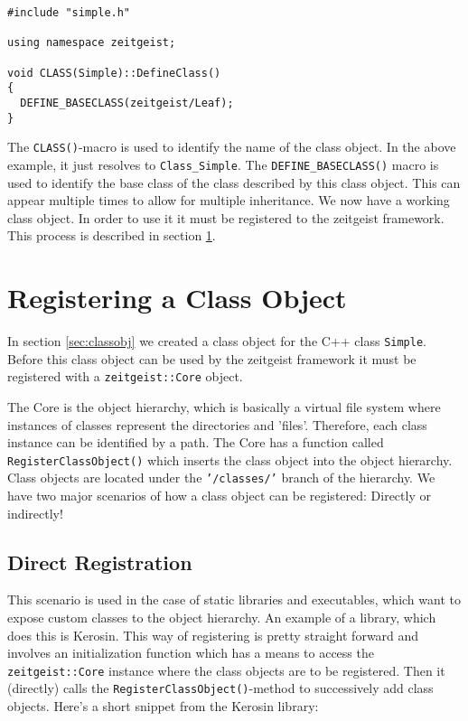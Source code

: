 \begin{verbatim}
#include "simple.h"

using namespace zeitgeist;

void CLASS(Simple)::DefineClass()
{
  DEFINE_BASECLASS(zeitgeist/Leaf);
}
\end{verbatim}


The \texttt{CLASS()}-macro is used to identify the name of the class
object. In the above example, it just resolves to
\texttt{Class\_Simple}. The \texttt{DEFINE\_BASECLASS()} macro is used to 
identify the base class of the class described by this class
object. This can appear multiple times to allow for multiple
inheritance. We now have a working class object. In order to use it it
must be registered to the zeitgeist framework. This process is
described in section \ref{sec:regobj}.

\section{Registering a Class Object}
\label{sec:regobj}

In section \ref{sec:classobj} we created a class object for the C++
class \texttt{Simple}. Before this class object can be used by the
zeitgeist framework it must be registered with a
\texttt{zeitgeist::Core} object. 

The Core is the object hierarchy, which is basically a virtual file
system where instances of classes represent the directories and
'files'. Therefore, each class instance can be identified by a
path. The Core has a function called \texttt{RegisterClassObject()}
which inserts the class object into the object hierarchy. Class
objects are located under the \texttt{'/classes/'} branch of the
hierarchy. We have two major scenarios of how a class object can be
registered: Directly or indirectly!

\subsection{Direct Registration}

This scenario is used in the case of static libraries and executables,
which want to expose custom classes to the object hierarchy. An
example of a library, which does this is Kerosin. This way of
registering is pretty straight forward and involves an initialization
function which has a means to access the \texttt{zeitgeist::Core}
instance where the class objects are to be registered. Then it
(directly) calls the \texttt{RegisterClassObject()}-method to
successively add class objects. Here's a short snippet from the
Kerosin library:

